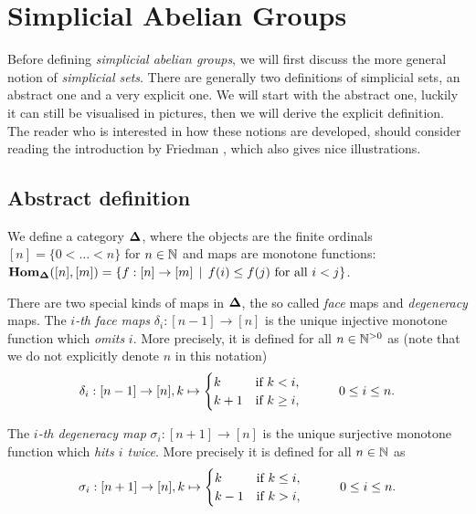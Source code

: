 \section{Simplicial Abelian Groups}
\label{sec:Simplicial Abelian Groups}

Before defining \emph{simplicial abelian groups}, we will first discuss the more general notion of \emph{simplicial sets}. There are generally two definitions of simplicial sets, an abstract one and a very explicit one. We will start with the abstract one, luckily it can still be visualised in pictures, then we will derive the explicit definition. The reader who is interested in how these notions are developed, should consider reading the introduction by Friedman \cite{friedman}, which also gives nice illustrations.

\subsection{Abstract definition}
\begin{definition}
	We define a category $\mathbf{\Delta}$, where the objects are the finite ordinals $[n] = \{0 < \dots < n\}$ for $n \in \mathbb{N}$ and maps are monotone functions: $\mathbf{Hom}_{\mathbf{\Delta}}([n], [m]) = \{ f : [n] \to [m] \,\mid\, f(i) \leq f(j) \text{ for all } i < j \}$.
\end{definition}

There are two special kinds of maps in $\mathbf{\Delta}$, the so called \emph{face} maps and \emph{degeneracy} maps. The \emph{$i$-th face maps} $\delta_i: [n-1] \to [n]$ is the unique injective monotone function which \emph{omits} $i$. More precisely, it is defined for all $n \in {\mathbb{N}^{>0}}$ as (note that we do not explicitly denote $n$ in this notation)
$$ \delta_i: [n-1] \to [n], k \mapsto \begin{cases} k & \text{if } k < i,\\ k+1 & \text{if } k \geq i, \end{cases} \hspace{1.0cm} 0 \leq i \leq n. $$

The \emph{$i$-th degeneracy map} $\sigma_i: [n+1] \to [n]$ is the unique surjective monotone function which \emph{hits $i$ twice}. More precisely it is defined for all $n \in \mathbb{N}$ as
$$ \sigma_i: [n+1] \to [n], k \mapsto \begin{cases} k & \text{if } k \leq i,\\ k-1 & \text{if } k > i, \end{cases} \hspace{1.0cm} 0 \leq i \leq n. $$

